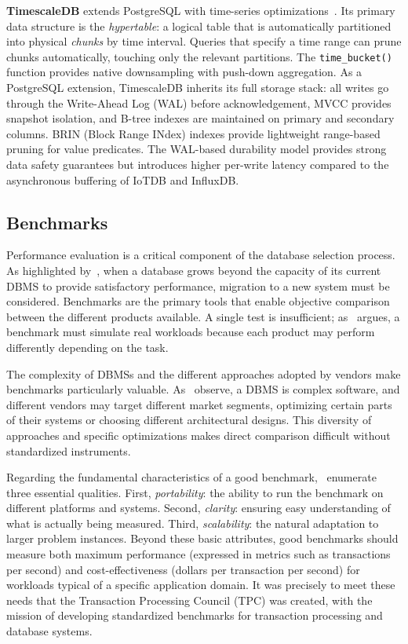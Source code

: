 \textbf{TimescaleDB} extends PostgreSQL with time-series optimizations~\cite{Ramakrishnan2003}.
Its primary data structure is the \textit{hypertable}: a logical table that is automatically
partitioned into physical \textit{chunks} by time interval. Queries that specify a time range
can prune chunks automatically, touching only the relevant partitions. The \texttt{time\_bucket()}
function provides native downsampling with push-down aggregation. As a PostgreSQL extension,
TimescaleDB inherits its full storage stack: all writes go through the Write-Ahead Log (WAL)
before acknowledgement, MVCC provides snapshot isolation, and B-tree indexes are maintained
on primary and secondary columns. BRIN (Block Range INdex) indexes provide lightweight
range-based pruning for value predicates. The WAL-based durability model provides strong
data safety guarantees but introduces higher per-write latency compared to the asynchronous
buffering of IoTDB and InfluxDB.

\subsection{Benchmarks}

Performance evaluation is a critical component of the database selection process.
As highlighted by~\cite{Ramakrishnan2003}, when a database grows beyond the capacity of its
current DBMS to provide satisfactory performance, migration to a new system must be considered.
Benchmarks are the primary tools that enable objective comparison between the different products
available. A single test is insufficient; as~\cite{Silberschatz2020} argues, a benchmark must
simulate real workloads because each product may perform differently depending on the task.

The complexity of DBMSs and the different approaches adopted by vendors make benchmarks
particularly valuable. As~\cite{Ramakrishnan2003} observe, a DBMS is complex software, and
different vendors may target different market segments, optimizing certain parts of their
systems or choosing different architectural designs. This diversity of approaches and
specific optimizations makes direct comparison difficult without standardized instruments.

Regarding the fundamental characteristics of a good benchmark,~\cite{Ramakrishnan2003} enumerate
three essential qualities. First, \textit{portability}: the ability to run the benchmark on
different platforms and systems. Second, \textit{clarity}: ensuring easy understanding of what
is actually being measured. Third, \textit{scalability}: the natural adaptation to larger
problem instances. Beyond these basic attributes, good benchmarks should measure both maximum
performance (expressed in metrics such as transactions per second) and cost-effectiveness
(dollars per transaction per second) for workloads typical of a specific application domain.
It was precisely to meet these needs that the Transaction Processing Council (TPC) was created,
with the mission of developing standardized benchmarks for transaction processing and database systems.

